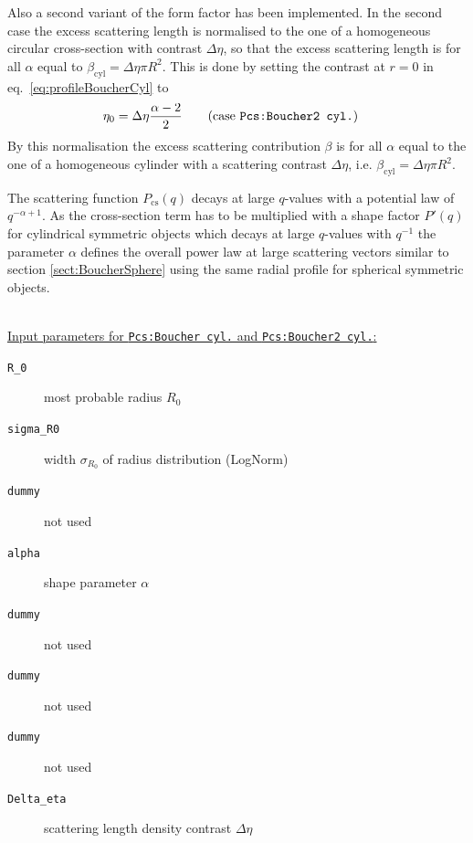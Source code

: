 Also a second variant of the form factor has been implemented. In the second case the excess scattering length is normalised to the one of a homogeneous circular cross-section with contrast $\Delta\eta$, so that the excess scattering length is for all $\alpha$ equal to $\beta_\mathrm{cyl}=\Delta\eta \pi R^2$. This is done by setting the contrast at $r=0$ in eq.\ \ref{eq:profileBoucherCyl} to
\begin{align}
\eta_0&=\Delta\eta \frac{\alpha-2}{2}  \qquad \mbox{(case \texttt{Pcs:Boucher2 cyl.})}
\label{eq:eta0BoucherCyl2}
\end{align}
By this normalisation the excess scattering contribution $\beta$ is for all $\alpha$ equal to the one of a homogeneous cylinder with a scattering contrast $\Delta\eta$, i.e. $\beta_\mathrm{cyl}=\Delta\eta \pi R^2$.

 The scattering function $P_\mathrm{cs}(q)$ decays at large $q$-values with a potential law of $q^{-\alpha+1}$. As the cross-section term has to be multiplied with a shape factor $P'(q)$ for cylindrical symmetric objects which decays at large $q$-values with $q^{-1}$ the parameter $\alpha$ defines the overall power law at large scattering vectors similar to section \ref{sect:BoucherSphere} using the same radial profile for spherical symmetric objects.

\vspace{1mm}

\hspace{1pt}\\
\underline{Input parameters for \texttt{Pcs:Boucher cyl.} and \texttt{Pcs:Boucher2 cyl.}:}
\begin{description}
    \item[\texttt{R\_0}] most probable radius $R_0$
    \item[\texttt{sigma\_R0}] width $\sigma_{R_0}$ of radius distribution (LogNorm)
    \item[\texttt{dummy}] not used
    \item[\texttt{alpha}] shape parameter $\alpha$
    \item[\texttt{dummy}] not used
    \item[\texttt{dummy}] not used
    \item[\texttt{dummy}] not used
    \item[\texttt{Delta\_eta}] scattering length density contrast $\Delta \eta$
\end{description}

